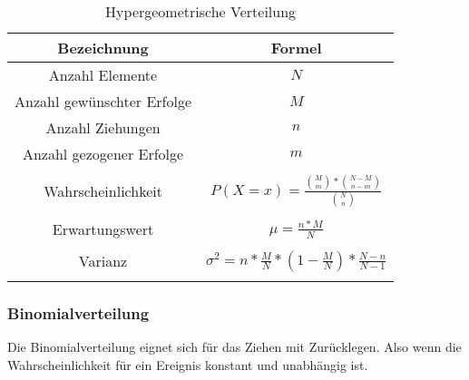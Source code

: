 \documentclass[12pt]{scrartcl}
\begin{document}
\begin{table}[h]
    \begin{tabular}{ | c | c | }
        \hline
        Bezeichnung                & Formel                                                           \\
        \hline
        Anzahl Elemente            & $N$                                                              \\
        Anzahl gewünschter Erfolge & $M$                                                              \\
        Anzahl Ziehungen           & $n$                                                              \\
        Anzahl gezogener Erfolge   & $m$                                                              \\
        \hline                     &                                                                  \\
        Wahrscheinlichkeit         & $P(X=x) = \frac{\binom{M}{m} * \binom{N-M}{n-m}}{\binom{N}{n}}$  \\&\\
        Erwartungswert             & $\mu = \frac{n*M}{N}$                                            \\&\\
        Varianz                    & $\sigma^2 = n * \frac{M}{N} * (1-\frac{M}{N}) * \frac{N-n}{N-1}$ \\&\\
        \hline
    \end{tabular}
    \caption{Hypergeometrische Verteilung}
\end{table}

\pagebreak

\subsubsection{Binomialverteilung}

Die Binomialverteilung eignet sich für das Ziehen mit Zurücklegen.
Also wenn die Wahrscheinlichkeit für ein Ereignis konstant und unabhängig ist.
\end{document}
